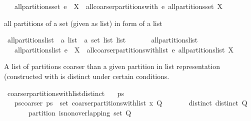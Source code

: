 \begin{isabellebody}
\ \ \ {\isachardoublequoteopen}all{\isacharunderscore}partitions{\isacharunderscore}set\ {\isacharparenleft}e\ {\isacharhash}\ X{\isacharparenright}\ {\isacharequal}\ all{\isacharunderscore}coarser{\isacharunderscore}partitions{\isacharunderscore}with\ e\ {\isacharparenleft}all{\isacharunderscore}partitions{\isacharunderscore}set\ X{\isacharparenright}{\isachardoublequoteclose}%
\begin{isamarkuptext}%
all partitions of a set (given as list) in form of a list%
\end{isamarkuptext}%
\isamarkuptrue%
\isamarkupfalse%
\ all{\isacharunderscore}partitions{\isacharunderscore}list\ {\isacharcolon}{\isacharcolon}\ {\isachardoublequoteopen}{\isacharprime}a\ list\ {\isasymRightarrow}\ {\isacharprime}a\ set\ list\ list{\isachardoublequoteclose}\isanewline
\ \ \ \isanewline
\ \ \ {\isachardoublequoteopen}all{\isacharunderscore}partitions{\isacharunderscore}list\ {\isacharbrackleft}{\isacharbrackright}\ {\isacharequal}\ {\isacharbrackleft}{\isacharbrackleft}{\isacharbrackright}{\isacharbrackright}{\isachardoublequoteclose}\ {\isacharbar}\isanewline
\ \ \ {\isachardoublequoteopen}all{\isacharunderscore}partitions{\isacharunderscore}list\ {\isacharparenleft}e\ {\isacharhash}\ X{\isacharparenright}\ {\isacharequal}\ all{\isacharunderscore}coarser{\isacharunderscore}partitions{\isacharunderscore}with{\isacharunderscore}list\ e\ {\isacharparenleft}all{\isacharunderscore}partitions{\isacharunderscore}list\ X{\isacharparenright}{\isachardoublequoteclose}%
\begin{isamarkuptext}%
A list of partitions coarser than a given partition in list representation (constructed
  with  is distinct under certain conditions.%
\end{isamarkuptext}%
\isamarkuptrue%
\isamarkupfalse%
\ coarser{\isacharunderscore}partitions{\isacharunderscore}with{\isacharunderscore}list{\isacharunderscore}distinct{\isacharcolon}\isanewline
\ \ \ ps\isanewline
\ \ \ ps{\isacharunderscore}coarser{\isacharcolon}\ {\isachardoublequoteopen}ps\ {\isasymin}\ set\ {\isacharparenleft}coarser{\isacharunderscore}partitions{\isacharunderscore}with{\isacharunderscore}list\ x\ Q{\isacharparenright}{\isachardoublequoteclose}\isanewline
\ \ \ \ \ \ \ distinct{\isacharcolon}\ {\isachardoublequoteopen}distinct\ Q{\isachardoublequoteclose}\isanewline
\ \ \ \ \ \ \ partition{\isacharcolon}\ {\isachardoublequoteopen}is{\isacharunderscore}non{\isacharunderscore}overlapping\ {\isacharparenleft}set\ Q{\isacharparenright}{\isachardoublequoteclose}\isanewline

\end{isabellebody}
